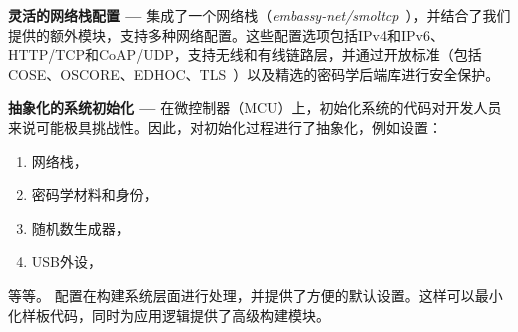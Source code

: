 \textbf{灵活的网络栈配置 ---}
\OSname{}集成了一个网络栈（\emph{embassy-net/smoltcp}~\cite{smoltcp}），并结合了我们提供的额外模块，支持多种网络配置。这些配置选项包括IPv4和IPv6、HTTP/TCP和CoAP/UDP，支持无线和有线链路层，并通过开放标准（包括COSE、OSCORE、EDHOC、TLS~\cite{tschofenig2019cyberphysical}）以及精选的密码学后端库进行安全保护。

\textbf{抽象化的系统初始化 ---}
在微控制器（MCU）上，初始化系统的代码对开发人员来说可能极具挑战性。因此，\OSname{}对初始化过程进行了抽象化，例如设置：
\begin{enumerate}[label=(\roman*)]
\item 网络栈，
\item 密码学材料和身份，
\item 随机数生成器，
\item USB外设，
\end{enumerate}
等等。
配置在构建系统层面进行处理，并提供了方便的默认设置。这样可以最小化样板代码，同时为应用逻辑提供了高级构建模块。%



